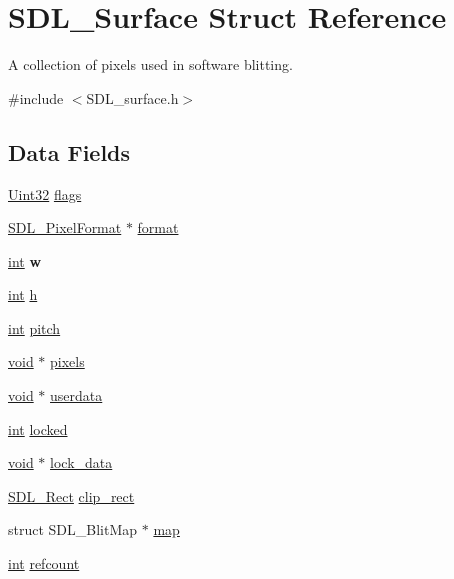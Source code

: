 \hypertarget{struct_s_d_l___surface}{}\section{S\+D\+L\+\_\+\+Surface Struct Reference}
\label{struct_s_d_l___surface}


A collection of pixels used in software blitting.  




{\ttfamily \#include $<$S\+D\+L\+\_\+surface.\+h$>$}

\subsection*{Data Fields}
\begin{DoxyCompactItemize}
\item 
\hyperlink{_s_d_l__stdinc_8h_add440eff171ea5f55cb00c4a9ab8672d}{Uint32} \hyperlink{struct_s_d_l___surface_a048097c5cc2146ce1ff2450684f1b51c}{flags}
\item 
\hyperlink{struct_s_d_l___pixel_format}{S\+D\+L\+\_\+\+Pixel\+Format} $\ast$ \hyperlink{struct_s_d_l___surface_a9d191a5bbd871cd7b4ded2158b4f61e8}{format}
\item 
\hyperlink{_s_d_l__thread_8h_a6a64f9be4433e4de6e2f2f548cf3c08e}{int} {\bfseries w}\hypertarget{struct_s_d_l___surface_aac374e320caaadeca4874add33b62af2}{}\label{struct_s_d_l___surface_aac374e320caaadeca4874add33b62af2}

\item 
\hyperlink{_s_d_l__thread_8h_a6a64f9be4433e4de6e2f2f548cf3c08e}{int} \hyperlink{struct_s_d_l___surface_a16611451551e3d15916bae723c3f59f7}{h}
\item 
\hyperlink{_s_d_l__thread_8h_a6a64f9be4433e4de6e2f2f548cf3c08e}{int} \hyperlink{struct_s_d_l___surface_a05c8b22d2905f7a52fa31b13f85c70f3}{pitch}
\item 
\hyperlink{_s_d_l__audio_8h_a52835ae37c4bb905b903cbaf5d04b05f}{void} $\ast$ \hyperlink{struct_s_d_l___surface_aaf78c2553b191735d6902cafb68a92ff}{pixels}
\item 
\hyperlink{_s_d_l__audio_8h_a52835ae37c4bb905b903cbaf5d04b05f}{void} $\ast$ \hyperlink{struct_s_d_l___surface_afd0ffb02780e738d4c0a10ab833b7834}{userdata}
\item 
\hyperlink{_s_d_l__thread_8h_a6a64f9be4433e4de6e2f2f548cf3c08e}{int} \hyperlink{struct_s_d_l___surface_a3656313f0cb42dffd0c00864ca333c25}{locked}
\item 
\hyperlink{_s_d_l__audio_8h_a52835ae37c4bb905b903cbaf5d04b05f}{void} $\ast$ \hyperlink{struct_s_d_l___surface_aae9edc33317dc7ff7c41d40fae6bb5c3}{lock\+\_\+data}
\item 
\hyperlink{struct_s_d_l___rect}{S\+D\+L\+\_\+\+Rect} \hyperlink{struct_s_d_l___surface_ada87d50bed22f849936519c4912a5a98}{clip\+\_\+rect}
\item 
struct S\+D\+L\+\_\+\+Blit\+Map $\ast$ \hyperlink{struct_s_d_l___surface_a6305e21db64c3e35a648981e733414b3}{map}
\item 
\hyperlink{_s_d_l__thread_8h_a6a64f9be4433e4de6e2f2f548cf3c08e}{int} \hyperlink{struct_s_d_l___surface_a6022c8a609170c7365fb96e83cb2df48}{refcount}
\end{DoxyCompactItemize}


